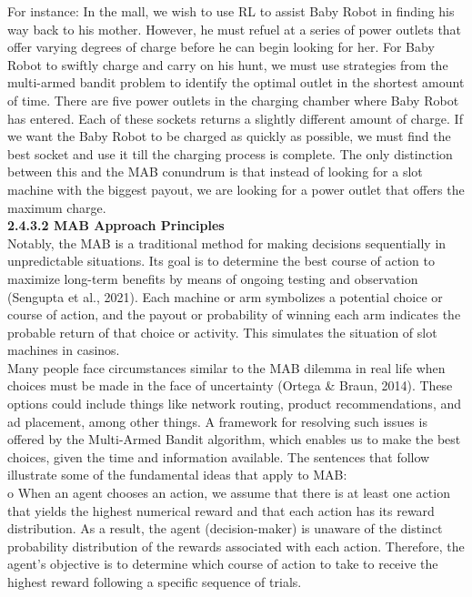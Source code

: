 \documentclass[a4paper,11pt,onecolumn]{article}
\begin{document}
For instance: In the mall, we wish to use RL to assist Baby Robot in finding his way back to his mother. However, he must refuel at a series of power outlets that offer varying degrees of charge before he can begin looking for her. For Baby Robot to swiftly charge and carry on his hunt, we must use strategies from the multi-armed bandit problem to identify the optimal outlet in the shortest amount of time.  There are five power outlets in the charging chamber where Baby Robot has entered. Each of these sockets returns a slightly different amount of charge. If we want the Baby Robot to be charged as quickly as possible, we must find the best socket and use it till the charging process is complete. The only distinction between this and the MAB conundrum is that instead of looking for a slot machine with the biggest payout, we are looking for a power outlet that offers the maximum charge.\newline \\
\textbf{2.4.3.2 MAB Approach Principles}\\
Notably, the MAB is a traditional method for making decisions sequentially in unpredictable situations. Its goal is to determine the best course of action to maximize long-term benefits by means of ongoing testing and observation (Sengupta et al., 2021). Each machine or arm symbolizes a potential choice or course of action, and the payout or probability of winning each arm indicates the probable return of that choice or activity. This simulates the situation of slot machines in casinos.\\
Many people face circumstances similar to the MAB dilemma in real life when choices must be made in the face of uncertainty (Ortega & Braun, 2014). These options could include things like network routing, product recommendations, and ad placement, among other things. A framework for resolving such issues is offered by the Multi-Armed Bandit algorithm, which enables us to make the best choices, given the time and information available. The sentences that follow illustrate some of the fundamental ideas that apply to MAB:\\
o	When an agent chooses an action, we assume that there is at least one action that yields the highest numerical reward and that each action has its reward distribution. As a result, the agent (decision-maker) is unaware of the distinct probability distribution of the rewards associated with each action. Therefore, the agent's objective is to determine which course of action to take to receive the highest reward following a specific sequence of trials.
\end{document}
